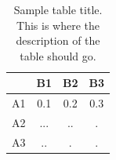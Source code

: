 \documentclass{classe_cn}                 %
\begin{document}
\begin{table}[h!]
\label{tag_tabela_01}
\caption{Sample table title. This is where the description of the table should go.}
  \begin{tabular}{cccc}
  \hline
       & B1   & B2   & B3   \\ \hline
   A1  & 0.1  & 0.2  & 0.3  \\
   A2  & ...  & ..   & .    \\
   A3  & ..   & .    & .    \\ \hline
  \end{tabular}
\end{table}


\vspace{1.0cm}
\end{document}
